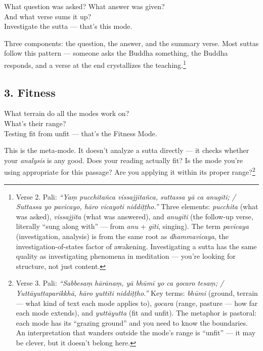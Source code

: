 \begin{versebox}
What question was asked? What answer was given?\\
And what verse sums it up?\\
Investigate the sutta --- that's this mode.
\end{versebox}

Three components: the question, the answer, and the summary verse. Most suttas follow this pattern --- someone asks the Buddha something, the Buddha responds, and a verse at the end crystallizes the teaching.\footnote{Verse 2. Pali: \textit{``Yaṃ pucchitañca vissajjitañca, suttassa yā ca anugīti; / Suttassa yo pavicayo, hāro vicayoti niddiṭṭho.''} Three elements: \textit{pucchita} (what was asked), \textit{vissajjita} (what was answered), and \textit{anugīti} (the follow-up verse, literally ``sung along with'' --- from \textit{anu} + \textit{gīti}, singing). The term \textit{pavicaya} (investigation, analysis) is from the same root as \textit{dhammavicaya}, the investigation-of-states factor of awakening. Investigating a sutta has the same quality as investigating phenomena in meditation --- you're looking for structure, not just content.}

\subsection*{3. Fitness}

\begin{versebox}
What terrain do all the modes work on?\\
What's their range?\\
Testing fit from unfit --- that's the Fitness Mode.
\end{versebox}

This is the meta-mode. It doesn't analyze a sutta directly --- it checks whether your \textit{analysis} is any good. Does your reading actually fit? Is the mode you're using appropriate for this passage? Are you applying it within its proper range?\footnote{Verse 3. Pali: \textit{``Sabbesaṃ hārānaṃ, yā bhūmī yo ca gocaro tesaṃ; / Yuttāyuttaparikkhā, hāro yuttīti niddiṭṭho.''} Key terms: \textit{bhūmi} (ground, terrain --- what kind of text each mode applies to), \textit{gocara} (range, pasture --- how far each mode extends), and \textit{yuttāyutta} (fit and unfit). The metaphor is pastoral: each mode has its ``grazing ground'' and you need to know the boundaries. An interpretation that wanders outside the mode's range is ``unfit'' --- it may be clever, but it doesn't belong here.}

